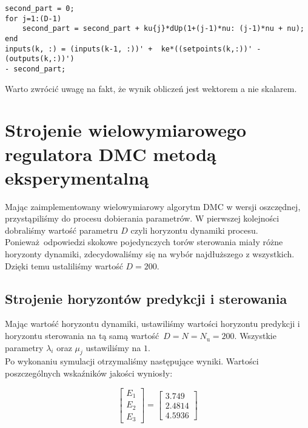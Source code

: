 \begin{lstlisting}[style=custommatlab,frame=single,label={pro_pid_parametry},caption={Obliczanie nowych sterowań w wielowymiarowym algorytmie DMC},captionpos=b]
% obliczenie nowych sterowan
second_part = 0;
for j=1:(D-1)
    second_part = second_part + ku{j}*dUp(1+(j-1)*nu: (j-1)*nu + nu);  
end
inputs(k, :) = (inputs(k-1, :))' +  ke*((setpoints(k,:))' - (outputs(k,:))')
- second_part; 
\end{lstlisting}

Warto zwrócić uwagę na fakt, że wynik obliczeń jest wektorem a nie skalarem.

\section{Strojenie wielowymiarowego regulatora DMC metodą eksperymentalną}
\label{pro_dmc_strojenie}
Mając zaimplementowany wielowymiarowy algorytm DMC w wersji oszczędnej, przystąpiliśmy
do procesu dobierania parametrów. W pierwszej kolejności dobraliśmy wartość parametru $D$ 
czyli horyzontu dynamiki procesu. Ponieważ odpowiedzi skokowe pojedynczych torów sterowania
miały różne horyzonty dynamiki, zdecydowaliśmy się na wybór najdłuższego z wszystkich.
Dzięki temu ustaliliśmy wartość $D = \num{200}$.\\


\subsection{Strojenie horyzontów predykcji i sterowania}
\label{pro_dmc_strojenie_horyzontow}
Mając wartość horyzontu dynamiki, ustawiliśmy wartości horyzontu predykcji i horyzontu
sterowania na tą samą wartość $D = N = N_{\mathrm{u}} = \num{200}$. Wszystkie parametry
$\lambda_{i}$ oraz $\mu_{j}$ ustawiliśmy na $\num{1}$. \\

Po wykonaniu symulacji otrzymaliśmy następujące wyniki. Wartości poszczególnych
wskaźników jakości wyniosły:

\[
\begin{bmatrix}
    E_{\mathrm{1}} \\
    E_{\mathrm{2}} \\
    E_{\mathrm{3}} 
\end{bmatrix}
= 
\begin{bmatrix}
    \num{3.749} \\
    \num{2.4814} \\
    \num{4.5936}
\end{bmatrix}
\]

